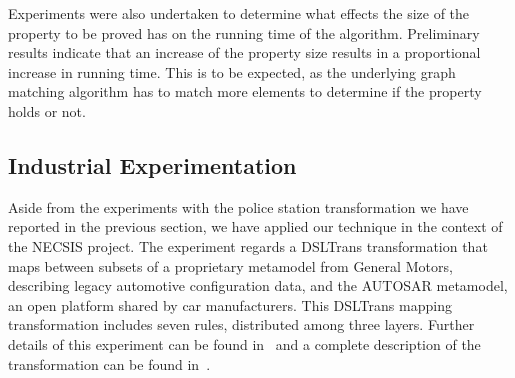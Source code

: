 Experiments were also undertaken to determine what effects the size of the property to be proved has on the running time of the algorithm. Preliminary results indicate that an increase of the property size results in a proportional increase in running time. This is to be expected, as the underlying graph matching algorithm has to match more elements to determine if the property holds or not.

% 

\subsection{Industrial Experimentation}
\label{sec:industrial_exp}

Aside from the experiments with the police station transformation we have
reported in the previous section, we have applied our technique in the context
of the NECSIS project.
The experiment regards a DSLTrans transformation that maps between subsets of a
proprietary metamodel from General Motors, describing legacy automotive configuration data, and
the AUTOSAR metamodel, an open platform shared by car manufacturers. This DSLTrans mapping transformation includes seven rules, distributed among three
layers. Further details of this experiment can be found in~\cite{gehan:13} and a complete description of the transformation can be found in~\cite{SelimWCD12}.

